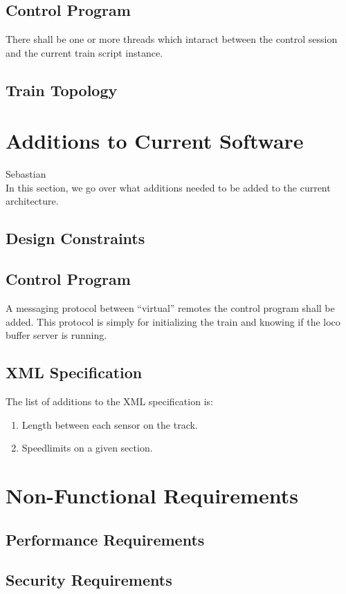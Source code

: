 \documentclass[a4paper,11pt,notitlepage]{article}
\begin{document}
\subsection{Control Program}
    There shall be one or more threads which intaract between the control session and the current train script instance.
\subsection{Train Topology}

\section{Additions to Current Software}
Sebastian \\
    In this section, we go over what additions needed to be added to the
    current architecture.
\subsection{Design Constraints}
\subsection{Control Program}
    A messaging protocol between ``virtual'' remotes the control program shall be added.  This protocol is simply for initializing the train and knowing if the loco buffer server is running.
\subsection{XML Specification}
    The list of additions to the XML specification is:
\begin{enumerate}
    \item Length between each sensor on the track.
    \item Speedlimits on a given section.
\end{enumerate}

\section{Non-Functional Requirements}
\subsection{Performance Requirements}
\subsection{Security Requirements}
\end{document}
